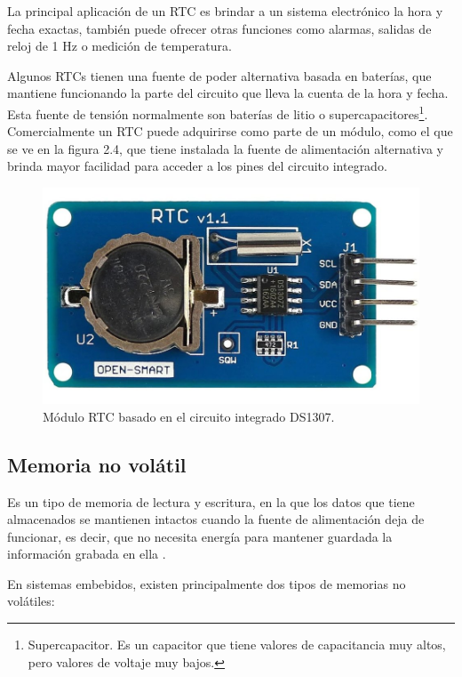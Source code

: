 La principal aplicación de un RTC es brindar a un sistema electrónico la hora y fecha exactas,  también puede ofrecer otras funciones como alarmas, salidas de reloj de 1 Hz o medición de temperatura.

Algunos RTCs tienen una fuente de poder alternativa basada en baterías, que mantiene funcionando la parte del circuito que lleva la cuenta de la hora y fecha. Esta fuente de tensión normalmente son baterías de litio o supercapacitores\footnote{Supercapacitor. Es un capacitor que tiene valores de capacitancia muy altos, pero valores de voltaje muy bajos.}. Comercialmente un RTC puede adquirirse como parte de un módulo, como el que se ve en la figura 2.4, que tiene instalada la fuente de alimentación alternativa y brinda mayor facilidad para acceder a los pines del circuito integrado.

\begin{figure}[h]
	\centering
	\includegraphics[scale=0.2]{./Figures/rtc.jpg}
	\caption{Módulo RTC basado en el circuito integrado DS1307.}
	\label{fig:cuadradoAzul}
\end{figure}

\subsection{Memoria no volátil}

Es un tipo de memoria de lectura y escritura, en la que los datos que tiene almacenados se mantienen intactos cuando la fuente de alimentación deja de funcionar, es decir, que no necesita energía para mantener guardada la información grabada en ella \citep{BOOK:3}.

En sistemas embebidos, existen principalmente dos tipos de memorias no volátiles:

